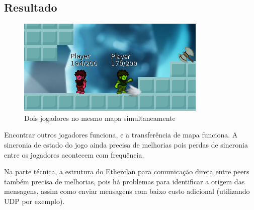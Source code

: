   \subsection{Resultado}
    \begin{figure}[h]
      \centering
      \includegraphics{imagens/vikings-multiplayer.png}
      \caption{Dois jogadores no mesmo mapa simultaneamente}
    \end{figure}
  
    Encontrar outros jogadores funciona, e a transferência de mapa funciona. A sincronia de estado do
    jogo ainda precisa de melhorias pois perdas de sincronia entre os jogadores acontecem com frequência.
    
    Na parte técnica, a estrutura do Etherclan para comunicação direta entre peers também precisa
    de melhorias, pois há problemas para identificar a origem das mensagens, assim como enviar
    mensagens com baixo custo adicional (utilizando UDP por exemplo).
